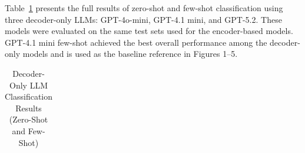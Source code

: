 \documentclass[
  11pt,
]{article}
\begin{document}
Table~\ref{tbl-llm-comparison} presents the full results of zero-shot
and few-shot classification using three decoder-only LLMs: GPT-4o-mini,
GPT-4.1 mini, and GPT-5.2. These models were evaluated on the same test
sets used for the encoder-based models. GPT-4.1 mini few-shot achieved
the best overall performance among the decoder-only models and is used
as the baseline reference in Figures 1--5.

\begin{longtable}[]{@{}
  >{\raggedright\arraybackslash}p{}
  >{\raggedright\arraybackslash}p{}
  >{\centering\arraybackslash}p{}
  >{\centering\arraybackslash}p{}
  >{\centering\arraybackslash}p{}
  >{\centering\arraybackslash}p{}@{}}

\caption{\label{tbl-llm-comparison}Decoder-Only LLM Classification
Results (Zero-Shot and Few-Shot)}

\tabularnewline


\end{longtable}
\end{document}
